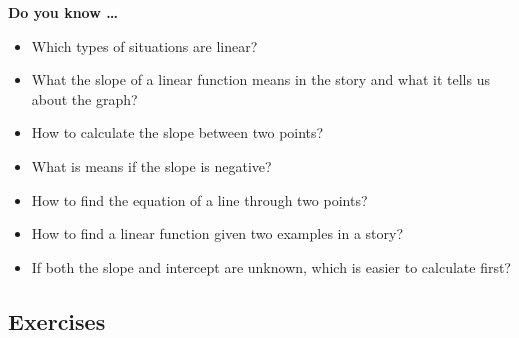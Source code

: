 


\noindent \textbf{Do you know \ldots}

\begin{itemize} 
\item Which types of situations are linear? 
\item What the slope of a linear function means in the story and what it tells us about the graph? 
\item How to calculate the slope between two points? 
\item What is means if the slope is negative? 
\item How to find the equation of a line through two points? 
\item How to find a linear function given two examples in a story? 
\item If both the slope and intercept are unknown, which is easier to calculate first? 

\end{itemize}

\subsection*{Exercises}

